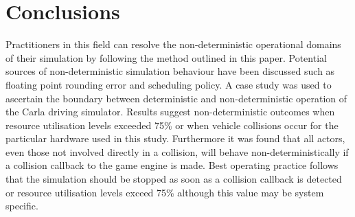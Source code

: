 \documentclass[letterpaper, 10 pt, journal, twoside]{IEEEtran}
\begin{document}

\section{Conclusions}\label{s:conclusion}
Practitioners in this field can resolve the non-deterministic operational domains of their simulation by following the method outlined in this paper. Potential sources of non-deterministic simulation behaviour have been discussed such as floating point rounding error and scheduling policy. A case study was used to ascertain the boundary between deterministic and non-deterministic operation of the Carla driving simulator. Results suggest non-deterministic outcomes when resource utilisation levels exceeded 75\% or when vehicle collisions occur for the particular hardware used in this study. Furthermore it was found that all actors, even those not involved directly in a collision, will behave non-deterministically if a collision callback to the game engine is made. Best operating practice follows that the simulation should be stopped as soon as a collision callback is detected or resource utilisation levels exceed 75\% although this value may be system specific. 

\end{document}
